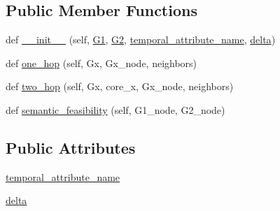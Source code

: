 \subsection*{Public Member Functions}
\begin{DoxyCompactItemize}
\item 
def \hyperlink{classnetworkx_1_1algorithms_1_1isomorphism_1_1temporalisomorphvf2_1_1TimeRespectingGraphMatcher_a7a1d6e83d779f5b84de2ad96b3572b47}{\+\_\+\+\_\+init\+\_\+\+\_\+} (self, \hyperlink{classnetworkx_1_1algorithms_1_1isomorphism_1_1isomorphvf2_1_1GraphMatcher_a7a5a2c6d9d4bc47ea16dd8392c2c2e17}{G1}, \hyperlink{classnetworkx_1_1algorithms_1_1isomorphism_1_1isomorphvf2_1_1GraphMatcher_a0513325f608a0a7357d0b43111e233ec}{G2}, \hyperlink{classnetworkx_1_1algorithms_1_1isomorphism_1_1temporalisomorphvf2_1_1TimeRespectingGraphMatcher_aab49b890145c0f5d7a66ded6c9cb2483}{temporal\+\_\+attribute\+\_\+name}, \hyperlink{classnetworkx_1_1algorithms_1_1isomorphism_1_1temporalisomorphvf2_1_1TimeRespectingGraphMatcher_a5cf72a02a0511acbf6e7e897fd000e82}{delta})
\item 
def \hyperlink{classnetworkx_1_1algorithms_1_1isomorphism_1_1temporalisomorphvf2_1_1TimeRespectingGraphMatcher_a375ed2e58d0b2a71c69cae0250e62bf7}{one\+\_\+hop} (self, Gx, Gx\+\_\+node, neighbors)
\item 
def \hyperlink{classnetworkx_1_1algorithms_1_1isomorphism_1_1temporalisomorphvf2_1_1TimeRespectingGraphMatcher_ae3e70667b056fc228408dd3ad96390d2}{two\+\_\+hop} (self, Gx, core\+\_\+x, Gx\+\_\+node, neighbors)
\item 
def \hyperlink{classnetworkx_1_1algorithms_1_1isomorphism_1_1temporalisomorphvf2_1_1TimeRespectingGraphMatcher_aa3a191d2ccd760dd2f998bfc5fa121a9}{semantic\+\_\+feasibility} (self, G1\+\_\+node, G2\+\_\+node)
\end{DoxyCompactItemize}
\subsection*{Public Attributes}
\begin{DoxyCompactItemize}
\item 
\hyperlink{classnetworkx_1_1algorithms_1_1isomorphism_1_1temporalisomorphvf2_1_1TimeRespectingGraphMatcher_aab49b890145c0f5d7a66ded6c9cb2483}{temporal\+\_\+attribute\+\_\+name}
\item 
\hyperlink{classnetworkx_1_1algorithms_1_1isomorphism_1_1temporalisomorphvf2_1_1TimeRespectingGraphMatcher_a5cf72a02a0511acbf6e7e897fd000e82}{delta}
\end{DoxyCompactItemize}


